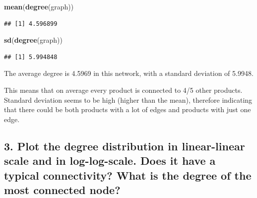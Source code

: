 \documentclass[
]{article}
\newenvironment{Shaded}{\begin{snugshade}}{\end{snugshade}}
\newcommand{\FunctionTok}[1]{\textcolor[rgb]{0.13,0.29,0.53}{\textbf{#1}}}
\newcommand{\NormalTok}[1]{#1}
\begin{document}
\begin{Shaded}
\begin{Highlighting}[]
\FunctionTok{mean}\NormalTok{(}\FunctionTok{degree}\NormalTok{(graph))}
\end{Highlighting}
\end{Shaded}

\begin{verbatim}
## [1] 4.596899
\end{verbatim}

\begin{Shaded}
\begin{Highlighting}[]
\FunctionTok{sd}\NormalTok{(}\FunctionTok{degree}\NormalTok{(graph))}
\end{Highlighting}
\end{Shaded}

\begin{verbatim}
## [1] 5.994848
\end{verbatim}

The average degree is 4.5969 in this network, with a standard deviation
of 5.9948.

This means that on average every product is connected to 4/5 other
products. Standard deviation seems to be high (higher than the mean),
therefore indicating that there could be both products with a lot of
edges and products with just one edge.

\subsection{3. Plot the degree distribution in linear-linear scale and
in log-log-scale. Does it have a typical connectivity? What is the
degree of the most connected
node?}\label{plot-the-degree-distribution-in-linear-linear-scale-and-in-log-log-scale.-does-it-have-a-typical-connectivity-what-is-the-degree-of-the-most-connected-node}
\end{document}
